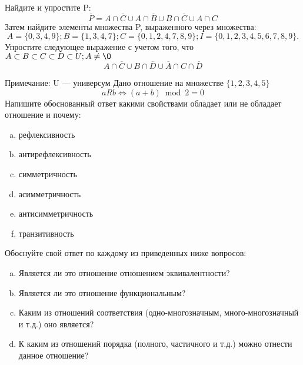 \documentclass[10pt]{exam}
\begin{document}
\begin{questions}
\question
Найдите и упростите P:
\begin{equation*}
\overline{P} = A \cap \overline{C} \cup A \cap \overline{B} \cup B \cap \overline{C} \cup A \cap C
\end{equation*}
Затем найдите элементы множества P, выраженного через множества:
\begin{equation*}
A = \{0, 3, 4, 9\}; 
B = \{1, 3, 4, 7\};
C = \{0, 1, 2, 4, 7, 8, 9\};
I = \{0, 1, 2, 3, 4, 5, 6, 7, 8, 9\}.
\end{equation*}\question
Упростите следующее выражение с учетом того, что $A\subset B \subset C \subset D \subset U; A \neq \O$
\begin{equation*}
A \cap  \overline{C} \cup B \cap \overline{D} \cup  \overline{A} \cap C \cap  \overline{D}
\end{equation*}

Примечание: U — универсум\question
Дано отношение на множестве $\{1, 2, 3, 4, 5\}$ 
\begin{equation*}
aRb \iff (a+b) \bmod 2 =0
\end{equation*}
Напишите обоснованный ответ какими свойствами обладает или не обладает отношение и почему:   
\begin{enumerate} [a)]\setcounter{enumi}{0}
\item рефлексивность
\item антирефлексивность
\item симметричность
\item асимметричность
\item антисимметричность
\item транзитивность
\end{enumerate}

Обоснуйте свой ответ по каждому из приведенных ниже вопросов:
\begin{enumerate} [a)]\setcounter{enumi}{0}
    \item Является ли это отношение отношением эквивалентности?
    \item Является ли это отношение функциональным?
    \item Каким из отношений соответствия (одно-многозначным, много-многозначный и т.д.) оно является?
    \item К каким из отношений порядка (полного, частичного и т.д.) можно отнести данное отношение?
\end{enumerate}




\end{questions}
\end{document}
